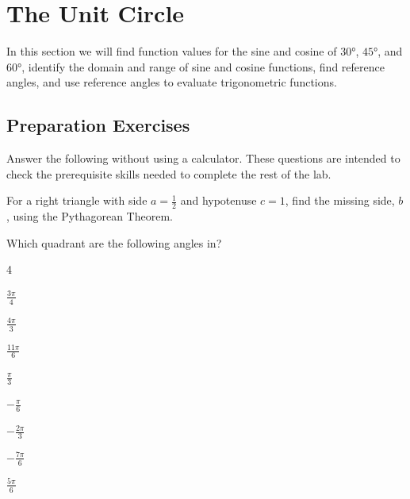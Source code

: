
\section{The Unit Circle} \label{section-unit-circle}
In this section we will find function values for the sine and cosine of $\ang{30}$, $\ang{45}$, and $\ang{60}$, identify the domain and range of sine and cosine functions, find reference angles, and use reference angles to evaluate trigonometric functions.


\subsection*{Preparation Exercises} \label{preparation-exercises-section-unit-circle}
Answer the following without using a calculator. These questions are intended to check the prerequisite skills needed to complete the rest of the lab.

\begin{myPrep}
	For a right triangle with side $a=\frac{1}{2}$ and hypotenuse $c=1$, find the missing side, $b$, using the Pythagorean Theorem.
\end{myPrep}
\vfill

\begin{myPrep}
	Which quadrant are the following angles in?
		\begin{enumerate}[label=(\roman*)]
		\end{enumerate}
\end{myPrep}
\vfill

